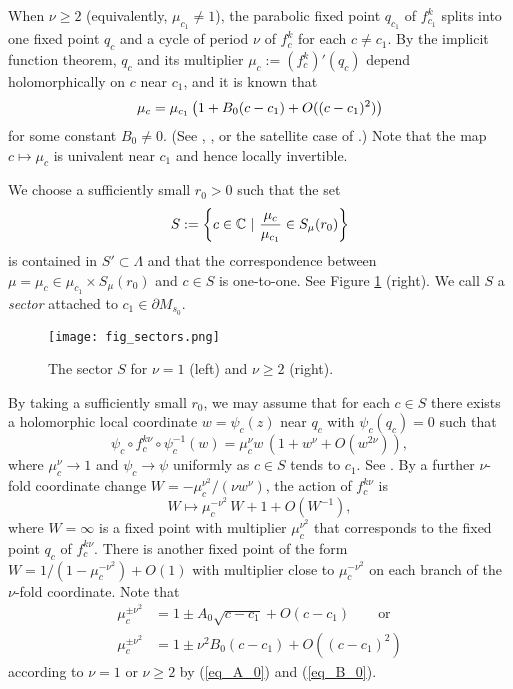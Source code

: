 When $\nu\ge 2$ (equivalently, $\mu_{c_1} \neq 1$),
the parabolic fixed point $q_{c_1}$ of $f_{c_1}^k$ 
splits into one fixed point $q_c$ and 
a cycle of period $\nu$ of $f_c^k$ for each $c \neq c_1$. 
By the implicit function theorem,
$q_c$ and its multiplier $\mu_c:=(f_c^k)'(q_c)$ depend holomorphically on $c$ near $c_1$,
and it is known that 
\begin{equation}\label{eq_B_0}
\mu_c=\mu_{c_1} \, {\left( 1+B_0 (c-c_1)+ O((c-c_1)^2) \right)}
\end{equation}
for some constant $B_0 \neq 0$.
(See \cite[Expos\'e XI]{DH Orsay}, \cite[Theorem A.1 (c)]{Tan Lei 2000},
or the satellite case of \cite[Lemma 4.2]{Milnor 2000}.)
Note that the map $c \mapsto \mu_c$ is univalent near $c_1$
and hence locally invertible. 

We choose a sufficiently small $r_0>0$ such that the set
$$
S:={\left\{ c \in \mathbb C \ | \  \frac{\mu_c}{\mu_{c_1}} \in S_\mu(r_0) \right\}}
$$
is contained in $S' \subset \Lambda$ 
and that 
the correspondence between $\mu=\mu_c \in  \mu_{c_1} \times S_\mu(r_0)$ 
and $c \in S$ is one-to-one.
See Figure \ref{fig_sectors} (right).
We call $S$ a {\it sector} attached to $c_1 \in \partial M_{s_0}$.

\begin{figure}[htbp]
\begin{center}
\texttt{[image: fig\_sectors.png]}
\end{center}
\caption{\small The sector $S$ for $\nu=1$ (left) and $\nu \ge 2$ (right).}
\label{fig_sectors}
\end{figure}



By taking a sufficiently small $r_0$, 
we may assume that for each $c \in S$
there exists a holomorphic local coordinate $w=\psi_c(z)$ 
near $q_{c}$ with $\psi_c(q_{c})=0$ such that
$$
\psi_c \circ f_{c}^{k\nu} \circ \psi_c^{-1}(w)
=\mu_c^\nu w\,(1 + w^{\nu}+O(w^{2\nu})),
$$
where $\mu_c^\nu \to 1$ and $\psi_c \to \psi$ 
uniformly as $c \in S$ tends to $c_1$.
See \cite[Appendix A.2]{Kawahira 2009}. 
By a further $\nu$-fold coordinate change $W=-\mu_c^{\nu^2}/(\nu w^\nu)$,
the action of $f_c^{k \nu} $ is 
$$
W \mapsto \mu_c^{-\nu^2} \,W +1+O(W^{-1}),
$$ 
where $W=\infty$ is a fixed point 
with multiplier $\mu_c^{\nu^2}$ 
that corresponds to the fixed point $q_c$ of $f_c^{k\nu}$.
There is another fixed point of the form $W=1/(1-\mu_c^{-\nu^2})+O(1)$
with multiplier close to $\mu_c^{-\nu^2}$
on each branch of the $\nu$-fold coordinate.
Note that  
\begin{align*}
\mu_c^{\pm \nu^2}&=
1 \pm A_0\sqrt{c-c_1}+O(c-c_1)
\qquad \text{or}\\
\mu_c^{\pm \nu^2}&=1 \pm \nu^2 B_0(c-c_1)+O((c-c_1)^2)
\end{align*}
according to $\nu=1$ or $\nu \ge 2$ by (\ref{eq_A_0}) and (\ref{eq_B_0}).

